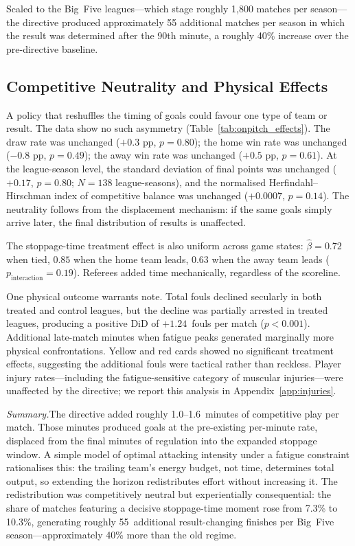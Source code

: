 Scaled to the Big~Five leagues---which stage roughly 1,800 matches per
season---the directive produced approximately 55 additional matches per
season in which the result was determined after the 90th minute, a
roughly 40\% increase over the pre-directive baseline.


\subsection{Competitive Neutrality and Physical Effects}
\label{subsec:neutrality}

A policy that reshuffles the timing of goals could favour one type of
team or result. The data show no such asymmetry
(Table~\ref{tab:onpitch_effects}). The draw rate was unchanged
($+0.3$ pp, $p = 0.80$); the home win rate was unchanged ($-0.8$ pp,
$p = 0.49$); the away win rate was unchanged ($+0.5$ pp, $p = 0.61$).
At the league-season level, the standard deviation of final points was
unchanged ($+0.17$, $p = 0.80$; $N = 138$ league-seasons), and the
normalised Herfindahl--Hirschman index of competitive balance was
unchanged ($+0.0007$, $p = 0.14$). The neutrality follows from the
displacement mechanism: if the same goals simply arrive later, the
final distribution of results is unaffected.

The stoppage-time treatment effect is also uniform across game states:
$\hat{\beta} = 0.72$ when tied, $0.85$ when the home team leads,
$0.63$ when the away team leads ($p_{\text{interaction}} = 0.19$).
Referees added time mechanically, regardless of the scoreline.

One physical outcome warrants note. Total fouls declined secularly in
both treated and control leagues, but the decline was partially
arrested in treated leagues, producing a positive DiD of $+1.24$~fouls
per match ($p < 0.001$). Additional late-match minutes when fatigue
peaks generated marginally more physical confrontations. Yellow and red
cards showed no significant treatment effects, suggesting the
additional fouls were tactical rather than reckless. Player injury
rates---including the fatigue-sensitive category of muscular
injuries---were unaffected by the directive; we report this analysis in
Appendix~\ref{app:injuries}.


\bigskip
\noindent\textit{Summary.}\quad The directive added roughly
1.0--1.6~minutes of competitive play per match. Those minutes produced
goals at the pre-existing per-minute rate, displaced from the final
minutes of regulation into the expanded stoppage window. A simple
model of optimal attacking intensity under a fatigue constraint
rationalises this: the trailing team's energy budget, not time,
determines total output, so extending the horizon redistributes effort
without increasing it. The redistribution was competitively neutral
but experientially consequential: the share of matches featuring a
decisive stoppage-time moment rose from 7.3\% to 10.3\%, generating
roughly 55~additional result-changing finishes per Big~Five
season---approximately 40\% more than the old regime.

